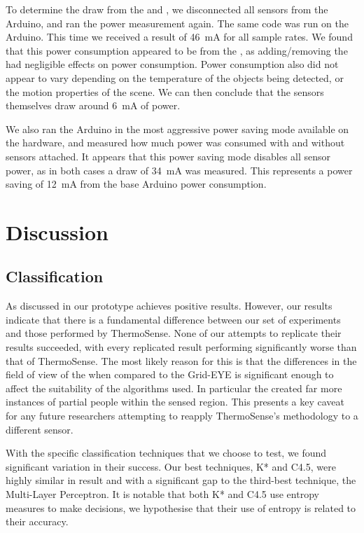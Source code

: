 \documentclass[../thesis/thesis.tex]{subfiles}
\begin{document}
To determine the draw from the \pir and \iar, we disconnected all sensors from the Arduino, and ran the power measurement again. The same code was run on the Arduino. This time we received a result of 46~mA  for all sample rates. We found that this power consumption appeared to be from the \mlx, as adding/removing the \pir had negligible effects on power consumption. Power consumption also did not appear to vary depending on the temperature of the objects being detected, or the motion properties of the scene. We can then conclude that the sensors themselves draw around 6~mA of power.

We also ran the Arduino in the most aggressive power saving mode available on the hardware, and measured how much power was consumed with and without sensors attached. It appears that this power saving mode disables all sensor power, as in both cases a draw of 34~mA was measured. This represents a power saving of 12~mA from the base Arduino power consumption.

\section{Discussion}

\subsection{Classification}
As discussed in  our prototype achieves positive results. However, our results indicate that there is a fundamental difference between our set of experiments and those performed by ThermoSense. None of our attempts to replicate their results succeeded, with every replicated result performing significantly worse than that of ThermoSense. The most likely reason for this is that the differences in the field of view of the \mlx when compared to the Grid-EYE is significant enough to affect the suitability of the algorithms used. In particular the \mlx created far more instances of partial people within the sensed region. This presents a key caveat for any future researchers attempting to reapply ThermoSense's methodology to a different sensor.

With the specific classification techniques that we choose to test, we found significant variation in their success. Our best techniques, K* and C4.5, were highly similar in result and with a significant gap to the third-best technique, the Multi-Layer Perceptron. It is notable that both K* and C4.5 use entropy measures to make decisions, we hypothesise that their use of entropy is related to their accuracy.
\end{document}
